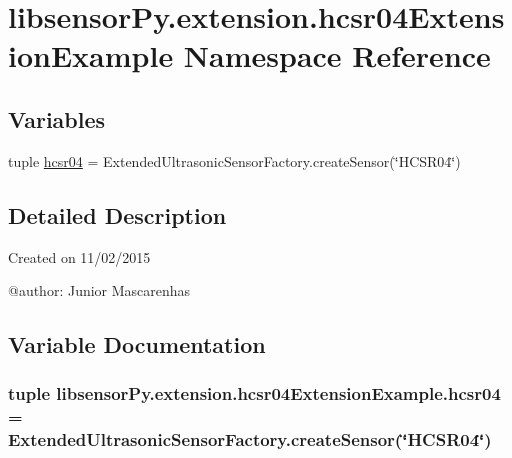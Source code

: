 \hypertarget{namespacelibsensorPy_1_1extension_1_1hcsr04ExtensionExample}{}\section{libsensor\+Py.\+extension.\+hcsr04\+Extension\+Example Namespace Reference}
\label{namespacelibsensorPy_1_1extension_1_1hcsr04ExtensionExample}
\subsection*{Variables}
\begin{DoxyCompactItemize}
\item 
tuple \hyperlink{namespacelibsensorPy_1_1extension_1_1hcsr04ExtensionExample_a41a6413b2c9bf301fb533d0c9cd943d2}{hcsr04} = Extended\+Ultrasonic\+Sensor\+Factory.\+create\+Sensor(\char`\"{}H\+C\+S\+R04\char`\"{})
\end{DoxyCompactItemize}


\subsection{Detailed Description}
\begin{DoxyVerb}Created on 11/02/2015

@author: Junior Mascarenhas
\end{DoxyVerb}
 

\subsection{Variable Documentation}
\hypertarget{namespacelibsensorPy_1_1extension_1_1hcsr04ExtensionExample_a41a6413b2c9bf301fb533d0c9cd943d2}{}
\subsubsection[{hcsr04}]{\setlength{\rightskip}{0pt plus 5cm}tuple libsensor\+Py.\+extension.\+hcsr04\+Extension\+Example.\+hcsr04 = Extended\+Ultrasonic\+Sensor\+Factory.\+create\+Sensor(\char`\"{}H\+C\+S\+R04\char`\"{})}\label{namespacelibsensorPy_1_1extension_1_1hcsr04ExtensionExample_a41a6413b2c9bf301fb533d0c9cd943d2}
